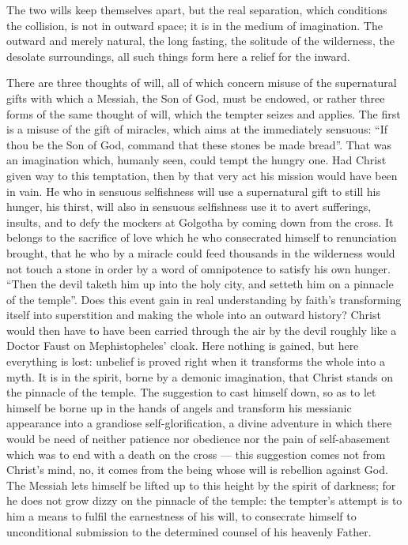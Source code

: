 \documentclass[12pt,a4paper,openany]{book}
\newcommand{\opage}[1]{\marginnote{\footnotesize\textit{[#1]}}}
\begin{document}
\setcounter{footnote}{0}%
\opage{63}The two wills keep themselves apart, but the real
separation, which conditions the collision, is not in
outward space; it is in the medium of imagination. The outward
and merely natural, the long fasting, the solitude of the
wilderness, the desolate surroundings, all such things form here
a relief for the inward.

There are three thoughts of will, all of which concern misuse
of the supernatural gifts with which a Messiah, the Son of
God, must be endowed, or rather three forms of
the same thought of will, which the tempter seizes and applies.
The first is a misuse of the gift of miracles,
which aims at the immediately sensuous: ``If thou be
the Son of God, command that these stones be made bread''. That
was an imagination which, humanly seen, could tempt
the hungry one. Had Christ given way to this
temptation, then by that very act his mission would have
been in vain. He who in sensuous selfishness will use a
supernatural gift to still his hunger, his thirst,
will also in sensuous selfishness use it to avert
sufferings, insults, and to defy the mockers at Golgotha
by coming down from the cross. It belongs to the
sacrifice of love which he who consecrated himself to renunciation
brought, that he who by a miracle could feed thousands
in the wilderness would not touch a stone in order by a word of omnipotence
to satisfy his own hunger. ``Then
the devil taketh him up into the holy city, and setteth
him on a pinnacle of the temple''. Does this event
gain in real understanding by faith's transforming
itself into superstition and making the whole into an outward history? %
Christ would then have to have been carried through the air by the devil
roughly like a Doctor Faust on Mephistopheles'
cloak. Here nothing is gained, but here everything is lost: unbelief
\setcounter{footnote}{0}%
\opage{64}is proved right when it transforms the whole into a myth.
It is in the spirit, borne by a demonic imagination,
that Christ stands on the pinnacle of the temple. The suggestion
to cast himself down, so as to let himself be borne up in the hands
of angels and transform his messianic appearance into
a grandiose self-glorification, a divine adventure
in which there would be need of neither patience nor obedience
nor the pain of self-abasement which was to end
with a death on the cross --- this suggestion comes
not from Christ's mind, no, it comes from the being
whose will is rebellion against God. The Messiah lets himself be lifted
up to this height by the spirit of darkness; for he does not grow dizzy
on the pinnacle of the temple: the tempter's attempt is to him a
means to fulfil the earnestness of his will, to consecrate himself to
unconditional submission to the determined counsel of his heavenly
Father.
\end{document}
